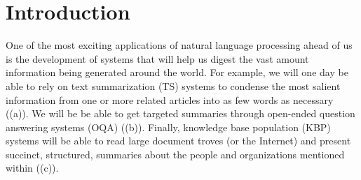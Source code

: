 
\chapter{\label{chap:intro} Introduction}

One of the most exciting applications of natural language processing ahead of us is the development of systems that will help us digest the vast amount information being generated around the world.
For example, we will one day be able to rely on 
text summarization (TS) systems to condense the most salient information from one or more related articles into as few words as necessary ((a)).
We will be be able to get targeted summaries through open-ended question answering systems (OQA) ((b)).
Finally, knowledge base population (KBP) systems  will be able to read large document troves (or the Internet) and present succinct, structured, summaries about the people and organizations mentioned within ((c)).

